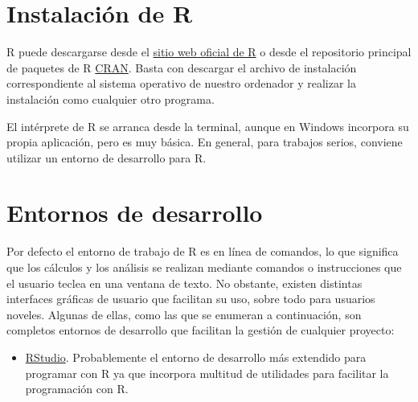 \documentclass[
  a4paper,
]{scrreport}
\providecommand{\tightlist}{%
  \setlength{\itemsep}{0pt}\setlength{\parskip}{0pt}}\usepackage{longtable,booktabs,array}
\theoremstyle{definition}
\theoremstyle{remark}
\begin{document}
\section{Instalación de R}\label{instalaciuxf3n-de-r}

R puede descargarse desde el \href{https://www.r-project.org/}{sitio web
oficial de R} o desde el repositorio principal de paquetes de R
\href{https://cran.r-project.org/}{CRAN}. Basta con descargar el archivo
de instalación correspondiente al sistema operativo de nuestro ordenador
y realizar la instalación como cualquier otro programa.

El intérprete de R se arranca desde la terminal, aunque en Windows
incorpora su propia aplicación, pero es muy básica. En general, para
trabajos serios, conviene utilizar un entorno de desarrollo para R.

\section{Entornos de desarrollo}\label{entornos-de-desarrollo}

Por defecto el entorno de trabajo de R es en línea de comandos, lo que
significa que los cálculos y los análisis se realizan mediante comandos
o instrucciones que el usuario teclea en una ventana de texto. No
obstante, existen distintas interfaces gráficas de usuario que facilitan
su uso, sobre todo para usuarios noveles. Algunas de ellas, como las que
se enumeran a continuación, son completos entornos de desarrollo que
facilitan la gestión de cualquier proyecto:

\begin{itemize}
\tightlist
\item
  \href{https://www.rstudio.com/}{RStudio}. Probablemente el entorno de
  desarrollo más extendido para programar con R ya que incorpora
  multitud de utilidades para facilitar la programación con R.
\end{itemize}
\end{document}
